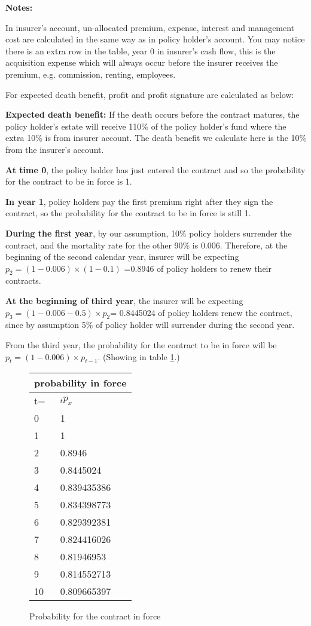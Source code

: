\documentclass{report}
\begin{document}
\textbf{Notes:}

In insurer's account, un-allocated premium, expense, interest and management cost are calculated in the same way as in policy holder's account. You may notice there is an extra row in the table, year 0 in insurer's cash flow, this is the acquisition expense which will always occur before the insurer receives the premium, e.g. commission, renting, employees.

For expected death benefit, profit and profit signature are calculated as below:

\textbf{Expected death benefit:} If the death occurs before the contract matures, the policy holder's estate will receive 110\% of the policy holder's fund where the extra 10\% is from insurer account. The death benefit we calculate here is the 10\% from the insurer's account. 

\textbf{At time 0}, the policy holder has just entered the contract and so the probability for the contract to be in force is 1.

\textbf{In year 1}, policy holders pay the first premium right after they sign the contract, so the probability for the contract to be in force is still 1. 

\textbf{During the first year}, by our assumption, 10\% policy holders surrender the contract, and the mortality rate for the other 90\% is 0.006. Therefore, at the beginning of the second calendar year, insurer will be expecting $p_2= (1-0.006) \times(1-0.1)$ =0.8946 of policy holders to renew their contracts. 

\textbf{At the beginning of third year}, the insurer will be expecting $p_3= (1-0.006-0.5) \times p_2$= 0.8445024 of policy holders renew the contract, since by assumption 5\% of policy holder will surrender during the second year.

From the third year, the probability for the contract to be in force will be $p_t = (1-0.006) \times p_{t-1}$. (Showing in table \ref{determ-prob-in-force}.)


\begin{figure}[H]
\begin{tabular}{|l|l|}
  \hline
  \multicolumn{2}{|c|}{probability in force} \\
  \hline
t=	& $_t p_x$\\
\hline
0	&1\\
1	&1\\
2	&0.8946\\
3	&0.8445024\\
4	&0.839435386\\
5	&0.834398773\\
6	&0.829392381\\
7	&0.824416026\\
8	&0.81946953\\
9	&0.814552713\\
10	&0.809665397\\
  \hline
\end{tabular}
\caption{Probability for the contract in force}
\label{determ-prob-in-force}
\end{figure}
\end{document}
